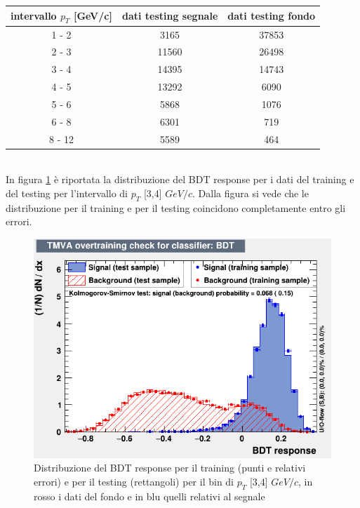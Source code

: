     \begin{table}[H]
		\centering
		\begin{tabular}{c|c|c}
		    \toprule
		    intervallo $p_T$ [GeV/c]  &   dati testing segnale & dati testing fondo  \\
            \midrule
            1 - 2  	&  3165   &  37853  \\ 
            2 - 3 	&  11560   &  26498  \\
            3 - 4  	&  14395   &  14743  \\ 
            4 - 5  	&  13292   &  6090 \\ 
            5 - 6  	&  5868   &  1076  \\ 
            6 - 8  	&  6301   &  719  \\ 
            8 - 12  &  5589   &   464 \\   
			\bottomrule
		\end{tabular}
	\end{table}
    
    \\In figura \ref{fig:testing_3_4} è riportata la distribuzione del BDT response per i dati del training e del testing per l'intervallo di $p_T$ [3,4] $GeV/c$. Dalla figura si vede che le distribuzione per il training e per il testing coincidono completamente entro gli errori.
    
    
    \begin{figure}[htbp] 
        \centering
        \includegraphics[width=0.7\linewidth]{training&testing/overtraining_3_4.png}
        \caption{Distribuzione del BDT response per il training (punti e relativi errori) e per il testing (rettangoli) per il bin di $p_T$ [3,4] $GeV/c$, in rosso i dati del fondo e in blu quelli relativi al segnale}
        \label{fig:testing_3_4}
    \end{figure}
 

